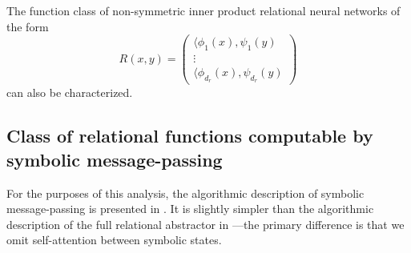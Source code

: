 \begin{remark}
	The function class of non-symmetric inner product relational neural networks of the form
	\[ R(x,y) = \begin{pmatrix}
		\langle \phi_1(x), \psi_1(y) \\
		\vdots \\
		\langle \phi_{d_r}(x), \psi_{d_r}(y)
	\end{pmatrix}\]
	can also be characterized.
\end{remark}

\subsection{Class of relational functions computable by symbolic message-passing}
\label{ssec:function_class_symbolic_mp}
For the purposes of this analysis, the algorithmic description of symbolic message-passing is presented in . It is slightly simpler than the algorithmic description of the full relational  abstractor in ---the primary difference is that we omit self-attention between symbolic states.








